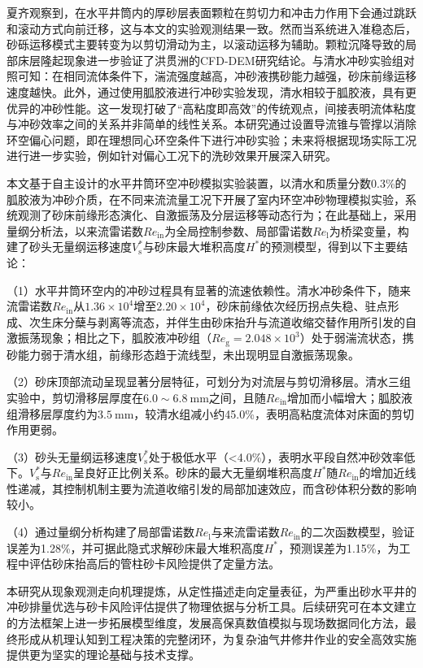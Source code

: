 夏齐\cite{ref21}观察到，在水平井筒内的厚砂层表面颗粒在剪切力和冲击力作用下会通过跳跃和滚动方式向前迁移，这与本文的实验观测结果一致。然而当系统进入准稳态后，砂砾运移模式主要转变为以剪切滑动为主，以滚动运移为辅助。颗粒沉降导致的局部床层隆起现象进一步验证了洪贯洲\cite{ref22}的CFD-DEM研究结论。与清水冲砂实验组对照可知：在相同流体条件下，湍流强度越高，冲砂液携砂能力越强，砂床前缘运移速度越快。此外，通过使用胍胶液进行冲砂实验发现，清水相较于胍胶液，具有更优异的冲砂性能。这一发现打破了“高粘度即高效”的传统观点，间接表明流体粘度与冲砂效率之间的关系并非简单的线性关系。本研究通过设置导流锥与管撑以消除环空偏心问题，即在理想同心环空条件下进行冲砂实验；未来将根据现场实际工况进行进一步实验，例如针对偏心工况下的洗砂效果开展深入研究。

本文基于自主设计的水平井筒环空冲砂模拟实验装置，以清水和质量分数0.3\%的胍胶液为冲砂介质，在不同来流流量工况下开展了室内环空冲砂物理模拟实验，系统观测了砂床前缘形态演化、自激振荡及分层运移等动态行为；在此基础上，采用量纲分析法，以来流雷诺数$Re_{\mathrm{in}}$为全局控制参数、局部雷诺数$Re_{\mathrm{l}}$为桥梁变量，构建了砂头无量纲运移速度$V_\mathrm{s}^*$与砂床最大堆积高度$H^*$的预测模型，得到以下主要结论：

（1）水平井筒环空内的冲砂过程具有显著的流速依赖性。清水冲砂条件下，随来流雷诺数$Re_{\mathrm{in}}$从$1.36\times10^4$增至$2.20\times10^4$，砂床前缘依次经历拐点失稳、驻点形成、次生床分蘖与剥离等流态，并伴生由砂床抬升与流道收缩交替作用所引发的自激振荡现象；相比之下，胍胶液冲砂组（$Re_{\mathrm{g}}=2.048\times10^{3}$）处于弱湍流状态，携砂能力弱于清水组，前缘形态趋于流线型，未出现明显自激振荡现象。

（2）砂床顶部流动呈现显著分层特征，可划分为对流层与剪切滑移层。清水三组实验中，剪切滑移层厚度在$6.0\sim6.8\ \mathrm{mm}$之间，且随$Re_{\mathrm{in}}$增加而小幅增大；胍胶液组滑移层厚度约为$3.5\ \mathrm{mm}$，较清水组减小约45.0\%，表明高粘度流体对床面的剪切作用更弱。

（3）砂头无量纲运移速度$V_\mathrm{s}^*$处于极低水平（<4.0\%），表明水平段自然冲砂效率低下。$V_\mathrm{s}^*$与$Re_{\mathrm{in}}$呈良好正比例关系。砂床的最大无量纲堆积高度$H^*$随$Re_{\mathrm{in}}$的增加近线性递减，其控制机制主要为流道收缩引发的局部加速效应，而含砂体积分数的影响较小。

（4）通过量纲分析构建了局部雷诺数$Re_{\mathrm{l}}$与来流雷诺数$Re_{\mathrm{in}}$的二次函数模型，验证误差为1.28\%，并可据此隐式求解砂床最大堆积高度$H^*$，预测误差为1.15\%，为工程中评估砂床抬高后的管柱砂卡风险提供了定量方法。

本研究从现象观测走向机理提炼，从定性描述走向定量表征，为严重出砂水平井的冲砂排量优选与砂卡风险评估提供了物理依据与分析工具。后续研究可在本文建立的方法框架上进一步拓展模型维度，发展高保真数值模拟与现场数据同化方法，最终形成从机理认知到工程决策的完整闭环，为复杂油气井修井作业的安全高效实施提供更为坚实的理论基础与技术支撑。


